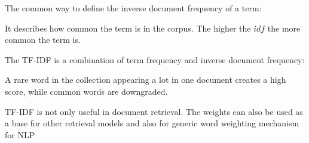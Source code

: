 \documentclass[
../../NLP4W_Summary.tex,
]
{subfiles}
\begin{document}
\begin{defbox}
    The common way to define the inverse document frequency of a term: 
    \begin{center}
        \begin{smallmathbox*}
        \end{smallmathbox*}
    \end{center}
    It describes how common the term is in the corpus. The higher the $idf$ the more common the term is.
\end{defbox}

\begin{defbox}
    [TF-IDF]
    The TF-IDF is a combination of term frequency and inverse document frequency:
    \begin{center}
        \begin{smallmathbox*}
        \end{smallmathbox*}
    \end{center}
    A rare word in the collection appearing a lot in one document creates a high score, while common words are downgraded.

    TF-IDF is not only useful in document retrieval. The weights can also be used as a base for other retrieval models and also for generic word weighting mechanism for NLP
\end{defbox}
\end{document}
